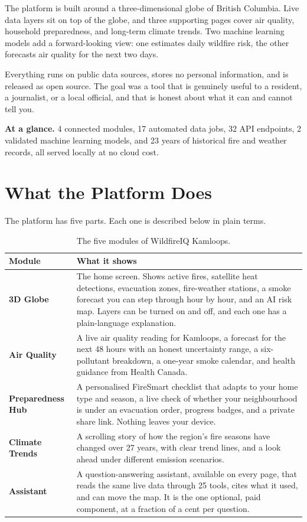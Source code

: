 \documentclass[11pt]{article}
\newcommand{\callout}[1]{%
  \par\medskip\noindent
  \colorbox{mist}{\parbox{\dimexpr\linewidth-2\fboxsep}{\color{ink}\small #1}}%
  \par\medskip}
\begin{document}
The platform is built around a three-dimensional globe of British Columbia.
Live data layers sit on top of the globe, and three supporting pages cover air
quality, household preparedness, and long-term climate trends. Two machine
learning models add a forward-looking view: one estimates daily wildfire risk,
the other forecasts air quality for the next two days.

Everything runs on public data sources, stores no personal information,
and is released as open source. The goal was a tool that is genuinely useful to
a resident, a journalist, or a local official, and that is honest about what it
can and cannot tell you.

\callout{\textbf{At a glance.} 4 connected modules, 17 automated data jobs, 32
API endpoints, 2 validated machine learning models, and 23 years of historical
fire and weather records, all served locally at no cloud cost.}

\section{What the Platform Does}

The platform has five parts. Each one is described below in plain terms.

\begin{table}[h]
\centering
\small
\begin{tabular}{@{}L{3.1cm}L{10.5cm}@{}}
\toprule
\textbf{Module} & \textbf{What it shows} \\
\midrule
\textbf{3D Globe} &
The home screen. Shows active fires, satellite heat detections, evacuation
zones, fire-weather stations, a smoke forecast you can step through hour by
hour, and an AI risk map. Layers can be turned on and off, and each one has a
plain-language explanation. \\
\textbf{Air Quality} &
A live air quality reading for Kamloops, a forecast for the next 48 hours with
an honest uncertainty range, a six-pollutant breakdown, a one-year smoke
calendar, and health guidance from Health Canada. \\
\textbf{Preparedness Hub} &
A personalised FireSmart checklist that adapts to your home type and season, a
live check of whether your neighbourhood is under an evacuation order, progress
badges, and a private share link. Nothing leaves your device. \\
\textbf{Climate Trends} &
A scrolling story of how the region's fire seasons have changed over 27 years,
with clear trend lines, and a look ahead under different emission scenarios. \\
\textbf{Assistant} &
A question-answering assistant, available on every page, that reads the same
live data through 25 tools, cites what it used, and can move the map. It is the
one optional, paid component, at a fraction of a cent per question. \\
\bottomrule
\end{tabular}
\caption{The five modules of WildfireIQ Kamloops.}
\end{table}
\end{document}
